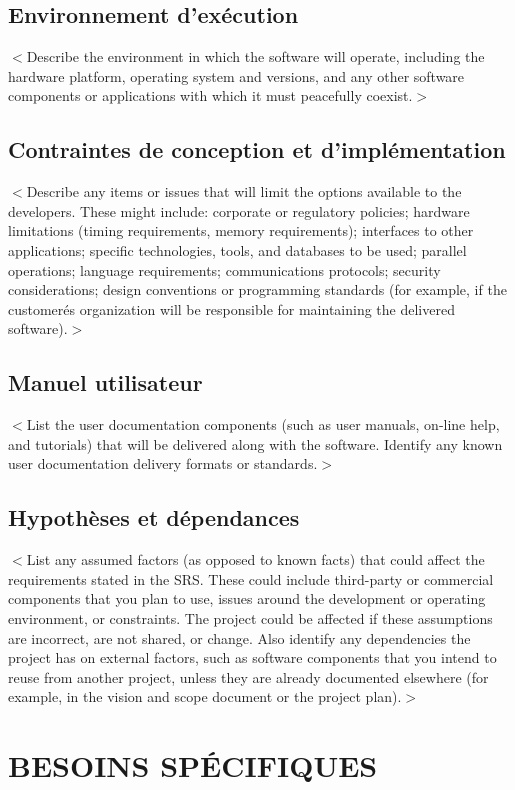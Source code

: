 \documentclass{scrreprt}
\begin{document}
\section{Environnement d'exécution}
$<$Describe the environment in which the software will operate, including the 
hardware platform, operating system and versions, and any other software 
components or applications with which it must peacefully coexist.$>$

\section{Contraintes de conception et d'implémentation}
$<$Describe any items or issues that will limit the options available to the 
developers. These might include: corporate or regulatory policies; hardware 
limitations (timing requirements, memory requirements); interfaces to other 
applications; specific technologies, tools, and databases to be used; parallel 
operations; language requirements; communications protocols; security 
considerations; design conventions or programming standards (for example, if the 
customerés organization will be responsible for maintaining the delivered 
software).$>$

\section{Manuel utilisateur}
$<$List the user documentation components (such as user manuals, on-line help, 
and tutorials) that will be delivered along with the software. Identify any 
known user documentation delivery formats or standards.$>$


\section{Hypothèses et dépendances}
$<$List any assumed factors (as opposed to known facts) that could affect the 
requirements stated in the SRS. These could include third-party or commercial 
components that you plan to use, issues around the development or operating 
environment, or constraints. The project could be affected if these assumptions 
are incorrect, are not shared, or change. Also identify any dependencies the 
project has on external factors, such as software components that you intend to 
reuse from another project, unless they are already documented elsewhere (for 
example, in the vision and scope document or the project plan).$>$


\chapter{BESOINS SPÉCIFIQUES}
\end{document}
